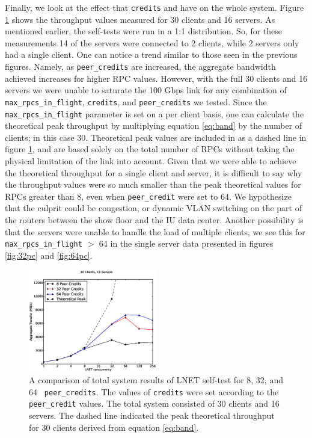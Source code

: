 \documentclass[]{sig-alternate}
\begin{document}
Finally, we look at the effect that {\tt credits} and  have on the whole system. Figure
\ref{fig:allserver} shows the throughput values measured for 30 clients and 16 servers. As mentioned earlier,
the self-tests were run in a 1:1 distribution. So, for these measurements 14 of the servers were connected to
2 clients, while 2 servers only had a single client. One can notice a trend similar to those seen in the
previous figures. Namely, as {\tt peer\_credits} are increased, the aggregate bandwidth achieved increases for
higher RPC values. However, with the full 30 clients and 16 servers we were unable to saturate the 100 Gbps
link for any combination of {\tt max\_rpcs\_in\_flight}, {\tt credits}, and {\tt peer\_credits} we
tested. Since the {\tt max\_rpcs\_in\_flight} parameter is set on a per client basis, one can calculate the
theoretical peak throughput by multiplying equation \ref{eq:band} by the number of clients; in this case
30. Theoretical peak values are included in as a dashed line in figure \ref{fig:allserver}, and are based
solely on the total number of RPCs without taking the physical limitation of the link into account. Given that
we were able to achieve the theoretical throughput for a single client and server, it is difficult to say why
the throughput values were so much smaller than the peak theoretical values for RPCs greater than 8, even when
{\tt peer\_credit} were set to 64. We hypothesize that the culprit could be congestion, or dynamic VLAN
switching on the part of the routers between the show floor and the IU data center. Another possibility is
that the servers were unable to handle the load of multiple clients, we see this for {\tt
  max\_rpcs\_in\_flight} $>$ 64 in the single server data presented in figures \ref{fig:32pc} and
\ref{fig:64pc}.

\begin{figure}
\centering
\includegraphics[width=0.50\textwidth]{figures/all_pc_theory_plot.eps}
\caption{A comparison of total system results of LNET self-test for 8, 32, and 64 {\tt
    peer\_credits}. The values of {\tt credits} were set according to the {\tt peer\_credit} values. The total
system consisted of 30 clients and 16 servers. The dashed line indicated the peak theoretical throughput for
30 clients derived from equation \ref{eq:band}.}
\label{fig:allserver}
\end{figure}
\end{document}
